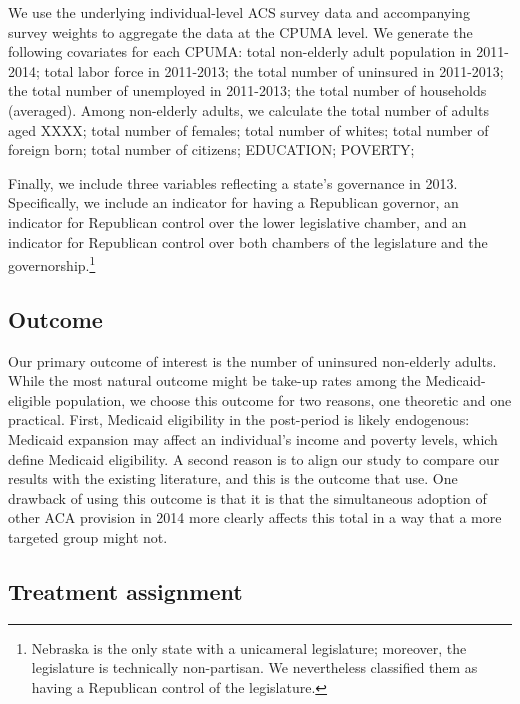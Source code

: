 \documentclass[12pt]{article}
\begin{document}
We use the underlying individual-level ACS survey data and accompanying survey weights to aggregate the data at the CPUMA level. We generate the following covariates for each CPUMA: total non-elderly adult population in 2011-2014; total labor force in 2011-2013; the total number of uninsured in 2011-2013; the total number of unemployed in 2011-2013; the total number of households (averaged). Among non-elderly adults, we calculate the total number of adults aged XXXX; total number of females; total number of whites; total number of foreign born; total number of citizens; EDUCATION; POVERTY; 

Finally, we include three variables reflecting a state's governance in 2013. Specifically, we include an indicator for having a Republican governor, an indicator for Republican control over the lower legislative chamber, and an indicator for Republican control over both chambers of the legislature and the governorship.\footnote{Nebraska is the only state with a unicameral legislature; moreover, the legislature is technically non-partisan. We nevertheless classified them as having a Republican control of the legislature.} 

\subsection{Outcome}

Our primary outcome of interest is the number of uninsured non-elderly adults. While the most natural outcome might be take-up rates among the Medicaid-eligible population, we choose this outcome for two reasons, one theoretic and one practical. First, Medicaid eligibility in the post-period is likely endogenous: Medicaid expansion may affect an individual's income and poverty levels, which define Medicaid eligibility. A second reason is to align our study to compare our results with the existing literature, and this is the outcome that \cite{courtemanche2017early} use. One drawback of using this outcome is that it is that the simultaneous adoption of other ACA provision in 2014 more clearly affects this total in a way that a more targeted group might not.

\subsection{Treatment assignment}
\end{document}
